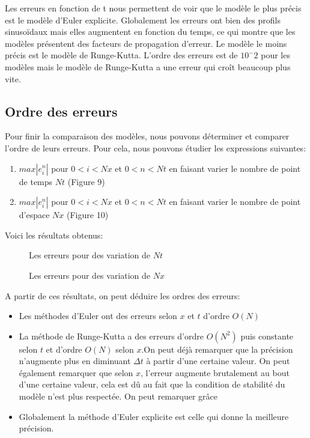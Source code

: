 Les erreurs en fonction de t nous permettent de voir que le modèle le plus précis est le modèle d'Euler explicite.
Globalement les erreurs ont bien des profils sinusoïdaux mais elles augmentent en fonction du temps, ce qui montre que les modèles présentent des facteurs de propagation d'erreur.
Le modèle le moins précis est le modèle de Runge-Kutta.
L'ordre des erreurs est de $10^-2$ pour les modèles mais le modèle de Runge-Kutta a une erreur qui croît beaucoup plus vite.

\vspace{1cm}
\subsection{Ordre des erreurs}
Pour finir la comparaison des modèles, nous pouvons déterminer et comparer l'ordre de leurs erreurs.
Pour cela, nous pouvons étudier les expressions suivantes:
\begin{enumerate}
    \item $max|e^n_{i}|$ pour $0<i<Nx$ et $0<n<Nt$ en faisant varier le nombre de point de temps $Nt$ (Figure 9)
    \item $max|e^n_{i}|$ pour $0<i<Nx$ et $0<n<Nt$ en faisant varier le nombre de point d'espace $Nx$ (Figure 10)
\end{enumerate}

Voici les résultats obtenus:

\begin{figure}[H]
\begin{center}
\centering{}
\caption{Les erreurs pour des variation de $Nt$\label{fig1}}
\end{center}
\end{figure}

\begin{figure}[H]
\begin{center}
\centering{}
\caption{Les erreurs pour des variation de $Nx$\label{fig1}}
\end{center}
\end{figure}

A partir de ces résultats, on peut déduire les ordres des erreurs:
\begin{itemize}
    \item Les méthodes d'Euler ont des erreurs selon $x$ et $t$ d'ordre $O(N)$
    \item La méthode de Runge-Kutta a des erreurs  d'ordre $O(N^2)$ puis constante selon $t$ et d'ordre $O(N)$ selon $x$.On peut déjà remarquer que la précision n'augmente plus en diminuant $\Delta t$ à partir d'une certaine valeur. On peut également remarquer que selon $x$, l'erreur augmente brutalement au bout d'une certaine valeur, cela est dû au fait que la condition de stabilité du modèle n'est plus respectée. On peut remarquer grâce
    \item Globalement la méthode d'Euler explicite est celle qui donne la meilleure précision.
\end{itemize}

